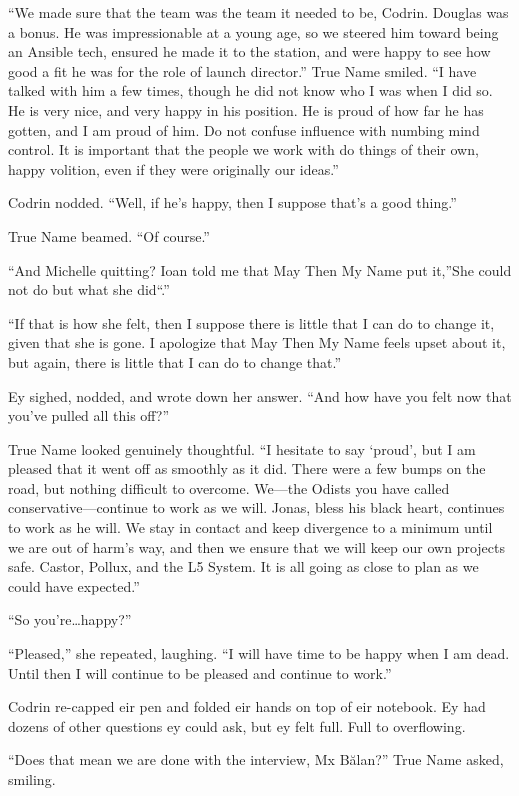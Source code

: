 ``We made sure that the team was the team it needed to be, Codrin. Douglas was a bonus. He was impressionable at a young age, so we steered him toward being an Ansible tech, ensured he made it to the station, and were happy to see how good a fit he was for the role of launch director.'' True Name smiled. ``I have talked with him a few times, though he did not know who I was when I did so. He is very nice, and very happy in his position. He is proud of how far he has gotten, and I am proud of him. Do not confuse influence with numbing mind control. It is important that the people we work with do things of their own, happy volition, even if they were originally our ideas.''

Codrin nodded. ``Well, if he's happy, then I suppose that's a good thing.''

True Name beamed. ``Of course.''

``And Michelle quitting? Ioan told me that May Then My Name put it,''She could not do but what she did``.''

``If that is how she felt, then I suppose there is little that I can do to change it, given that she is gone. I apologize that May Then My Name feels upset about it, but again, there is little that I can do to change that.''

Ey sighed, nodded, and wrote down her answer. ``And how have you felt now that you've pulled all this off?''

True Name looked genuinely thoughtful. ``I hesitate to say `proud', but I am pleased that it went off as smoothly as it did. There were a few bumps on the road, but nothing difficult to overcome. We---the Odists you have called conservative---continue to work as we will. Jonas, bless his black heart, continues to work as he will. We stay in contact and keep divergence to a minimum until we are out of harm's way, and then we ensure that we will keep our own projects safe. Castor, Pollux, and the L5 System. It is all going as close to plan as we could have expected.''

``So you're\ldots happy?''

``Pleased,'' she repeated, laughing. ``I will have time to be happy when I am dead. Until then I will continue to be pleased and continue to work.''

Codrin re-capped eir pen and folded eir hands on top of eir notebook. Ey had dozens of other questions ey could ask, but ey felt full. Full to overflowing.

``Does that mean we are done with the interview, Mx Bălan?'' True Name asked, smiling.

